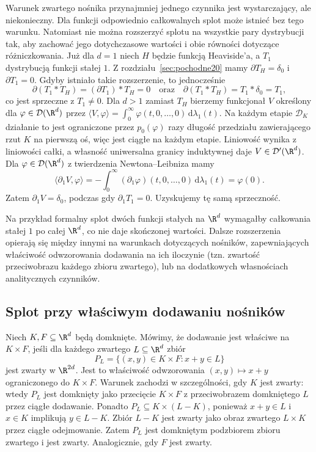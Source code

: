 \begin{uwaga}
\label{rem:convolution-limits21}
Warunek zwartego nośnika przynajmniej jednego
czynnika jest wystarczający, ale niekonieczny.
Dla funkcji odpowiednio całkowalnych splot może istnieć
bez tego warunku. Natomiast nie można rozszerzyć splotu na wszystkie pary
dystrybucji tak, aby zachować jego dotychczasowe wartości
i obie równości dotyczące różniczkowania.
Już dla $d=1$ niech $H$ będzie funkcją Heaviside'a,
a $T_1$ dystrybucją funkcji stałej $1$.
Z rozdziału~\ref{sec:pochodne20} mamy $\partial T_H=\delta_0$ i
$\partial T_1=0$. Gdyby istniało takie rozszerzenie,
to jednocześnie
\[
 \partial(T_1*T_H)=(\partial T_1)*T_H=0
 \quad\text{oraz}\quad
 \partial(T_1*T_H)=T_1*\delta_0=T_1,
\]
co jest sprzeczne z $T_1\ne0$.
Dla $d>1$ zamiast $T_H$ bierzemy funkcjonał $V$
określony dla $\varphi\in\mathcal D(\R^d)$ przez
$\langle V,\varphi\rangle=\int_0^\infty
\varphi(t,0,\ldots,0)\,\mathrm d\lambda_1(t)$.
Na każdym etapie $\mathcal D_K$ działanie to jest
ograniczone przez $p_0(\varphi)$ razy długość
przedziału zawierającego rzut $K$ na pierwszą oś,
więc jest ciągłe na każdym etapie. Liniowość wynika z
liniowości całki, a własność uniwersalna granicy induktywnej
daje $V\in\mathcal D'(\R^d)$. Dla $\varphi\in\mathcal D(\R^d)$
z twierdzenia Newtona--Leibniza mamy
\[
 \langle\partial_1V,\varphi\rangle
 =-\int_0^\infty(\partial_1\varphi)(t,0,\ldots,0)
 \,\mathrm d\lambda_1(t)=\varphi(0).
\]
Zatem $\partial_1 V=\delta_0$, podczas gdy
$\partial_1 T_1=0$. Uzyskujemy tę samą sprzeczność.

Na przykład formalny splot dwóch funkcji stałych
na $\R^d$ wymagałby całkowania stałej $1$
po całej $\R^d$, co nie daje skończonej wartości.
Dalsze rozszerzenia opierają się między innymi
na warunkach dotyczących nośników, zapewniających
właściwość odwzorowania dodawania na ich iloczynie
(tzn. zwartość przeciwobrazu każdego zbioru zwartego),
lub na dodatkowych własnościach analitycznych czynników.
\end{uwaga}

\subsection{Splot przy właściwym dodawaniu nośników}

\begin{definicja}
\label{def:dt-convolution-proper}
Niech $K,F\subseteq\R^d$ będą domknięte.
Mówimy, że dodawanie jest właściwe na $K\times F$,
jeśli dla każdego zwartego $L\subseteq\R^d$ zbiór
\[
 P_L=\{(x,y)\in K\times F:x+y\in L\}
\]
jest zwarty w $\R^{2d}$. Jest to właściwość odwzorowania
$(x,y)\mapsto x+y$ ograniczonego do $K\times F$.
Warunek zachodzi w szczególności, gdy $K$ jest zwarty:
wtedy $P_L$ jest domknięty jako przecięcie $K\times F$
z przeciwobrazem domkniętego $L$ przez ciągłe dodawanie.
Ponadto $P_L\subseteq K\times(L-K)$, ponieważ
$x+y\in L$ i $x\in K$ implikują $y\in L-K$.
Zbiór $L-K$ jest zwarty jako obraz zwartego $L\times K$
przez ciągłe odejmowanie. Zatem $P_L$ jest domkniętym
podzbiorem zbioru zwartego i jest zwarty.
Analogicznie, gdy $F$ jest zwarty.
\end{definicja}

